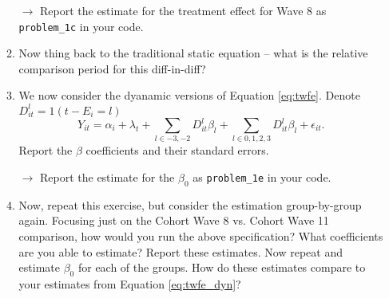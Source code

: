 \documentclass[11pt, a4paper]{article}
\begin{document}
\begin{enumerate}
\begin{enumerate}
        \hspace{10pt} $\rightarrow$ Report the estimate for the treatment effect for Wave 8 as   \texttt{problem\_1c} in your code. 
      \item Now thing back to the traditional static equation -- what is
        the relative comparison period for this diff-in-diff? 
      \item We now consider the dyanamic versions of Equation
        \ref{eq:twfe}. Denote $D_{it}^{l} = 1(t - E_{i} = l)$
        \begin{equation}\label{eq:twfe_dyn}
          Y_{it} = \alpha_{i} + \lambda_{t} + \sum_{l \in -3,-2} D^{l}_{it}\beta_{l} +  \sum_{l \in 0,1,2,3} D^{l}_{it}\beta_{l} + \epsilon_{it}.
        \end{equation}
        Report the $\beta$ coefficients and their standard errors.
      
        \hspace{10pt} $\rightarrow$ Report the estimate for the $\beta_{0}$  as   \texttt{problem\_1e} in your code. 
      \item Now, repeat this exercise, but consider the estimation
        group-by-group again. Focusing just on the Cohort Wave 8
        vs. Cohort Wave 11 comparison, how would you run the above
        specification? What coefficients are you able to estimate? Report
        these estimates. Now repeat and estimate $\beta_{0}$ for each of
        the groups. How do these estimates compare to your estimates from
        Equation \ref{eq:twfe_dyn}?


\end{enumerate}
\end{enumerate}
\end{document}
